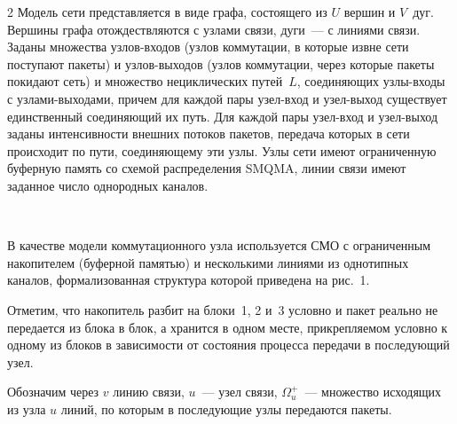 \begin{multicols}{2}
     Модель сети представляется в виде графа, состоящего из $U$ вершин и 
$V$~дуг. Вершины графа отождествляются с узлами связи, дуги~--- с 
линиями связи. Заданы множества узлов-входов (узлов коммутации, в 
которые извне сети поступают пакеты) и узлов-выходов (узлов коммутации, 
через которые пакеты покидают сеть) и множество нециклических 
путей~$L$, соединяющих узлы-входы с уз\-ла\-ми-выходами, причем для 
каждой пары узел-вход и узел-выход существует единственный 
соединяющий их путь. Для каждой пары узел-вход и узел-выход заданы 
интенсивности внешних потоков пакетов, передача которых в сети 
происходит по пути, соединяющему эти узлы. Узлы сети имеют 
ограниченную буферную память со схемой распределения SMQMA, линии 
связи имеют заданное число однородных каналов. 

\begin{figure} %
\vspace*{1pt}
 \begin{center}
 \mbox{%
 \epsfxsize=132.345mm
 }
 \end{center}
 \vspace*{-9pt}
\end{figure}

     В качестве модели коммутационного узла используется СМО 
     с ограниченным накопителем (буферной памятью) 
и несколькими линиями из однотипных каналов, формализованная структура 
которой приведена на рис.~1. 

  
  Отметим, что накопитель разбит на блоки~1, 2 и~3 условно и пакет 
реально не передается из блока в блок, а хранится в одном месте, 
прикрепляемом условно к одному из блоков в зависимости от состояния 
процесса передачи в последующий узел. 
     
     Обозначим через $v$ линию связи, $u$~--- узел связи, 
     $\Omega_u^+$~--- множество исходящих из узла $u$ линий, по 
которым в последующие узлы передаются пакеты.
  

\end{multicols}
